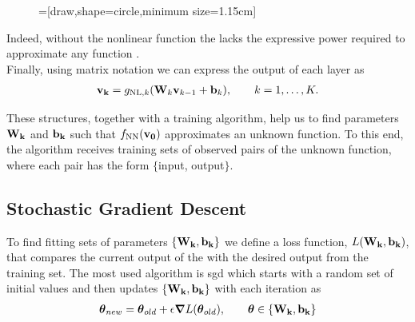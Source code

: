 \begin{figure}[H]
=[draw,shape=circle,minimum size=1.15cm]
\centering
{}
	
\end{figure}
Indeed, without the nonlinear function the  lacks the expressive power required to approximate any function \cite{HORNIK1989359}.\\
Finally, using matrix notation we can express the output of each layer as
\begin{align}
	\vb{v_k} = g_{\text{NL},k}(\vb{W}_k\vb{v}_{k-1}+\vb{b}_k), \qquad k = 1, \dots, K.
\end{align}

These structures, together with a training algorithm, help us to find parameters $\bold{W_k}$ and $\bold{b_k}$ such that $f_{\text{NN}}(\bold{v_0})$ approximates an unknown function. To this end, the algorithm receives training sets of observed pairs of the unknown function, where each pair has the form $\{$input, output$\}$.

\subsection{Stochastic Gradient Descent}
To find fitting sets of parameters $\{\bold{W_k}, \bold{b_k}\}$ we define a loss function,  $L(\bold{W_k} , \bold{b_k})$, that compares the current output of the  with the desired output from the training set. The most used algorithm is \acrfull{sgd} which starts with a random set of initial values and then updates $\{\bold{W_k}, \bold{b_k}\}$ with each iteration as
\begin{align}
	\boldsymbol{\theta}_{new} = \boldsymbol{\theta}_{old} + \epsilon \grad L(\boldsymbol{\theta}_{old}), \qquad \boldsymbol{\theta} \in \{\bold{W_k}, \bold{b_k}\}
\end{align}

